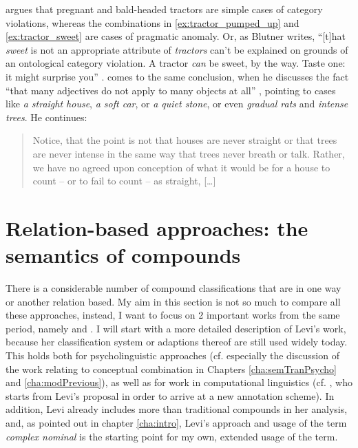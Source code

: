 \citeauthor{Blutner:1998} argues that pregnant and bald-headed tractors are simple cases of category
violations, whereas the combinations in \ref{ex:tractor_pumped_up} and
\ref{ex:tractor_sweet} are cases of pragmatic anomaly. Or, as Blutner
writes, ``[t]hat \emph{sweet} is not an appropriate attribute of
\emph{tractors} can't be explained on grounds of an ontological
category violation. A tractor \emph{can} be sweet, by the way. Taste
one: it might surprise you'' \citep[123, his
emphasis]{Blutner:1998}. \citet[265--266]{Lahav:1989} comes to the same
conclusion, when he discusses the fact ``that many adjectives do
not apply to many objects at all'' \citep[265]{Lahav:1989}, pointing to
cases like \emph{a straight house}, \emph{a soft car}, or \emph{a
  quiet stone}, or even \emph{gradual rats} and \emph{intense trees}. He continues:
\begin{quotation}
Notice, that the point is not that
houses are never straight or that trees are never intense in the same
way that trees never breath or talk. Rather, we have no agreed upon
conception of what it would be for a house to count -- or to fail to
count -- as straight, [\dots] \citep[265]{Lahav:1989} %
\end{quotation}
 
\section{Relation-based approaches: the semantics of compounds}
\label{sec:relation-based-approaches}
There is a considerable number of compound classifications that are in one way
or another relation based. My aim in this section is not so much to compare
all these approaches, instead, I want to focus on 2 important works from the same period, namely \citet{Levi:1978} and \citet{Fanselow:1981}. I
will start with a more detailed description of Levi's work, because her
classification system or adaptions thereof are still used widely
today. This holds both for psycholinguistic approaches
(cf. especially the discussion of the work relating to conceptual
combination in Chapters \ref{cha:semTranPsycho} and
\ref{cha:modPrevious}), as well as for work in computational
linguistics (cf. \citealt{Oseaghdha:2008}, who starts from
Levi's proposal in order to arrive at a new annotation scheme). In addition, Levi already
includes more than traditional compounds in her analysis, and, as pointed out in
chapter \ref{cha:intro}, Levi's approach and usage of the term
\emph{complex nominal} is the starting point for my own, extended
usage of the term.

